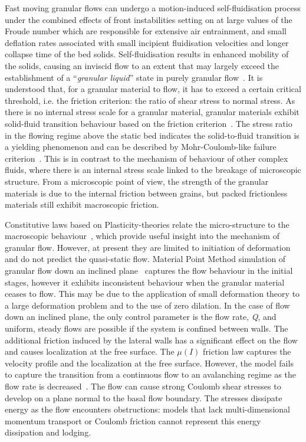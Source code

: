 Fast moving granular flows can undergo a motion-induced self-fluidisation 
process under the combined effects of front instabilities setting on at large 
values of the Froude number which are responsible for extensive air 
entrainment, and small deflation rates associated with small incipient 
fluidisation velocities and longer collapse time of the bed solids. 
Self-fluidisation results in enhanced mobility of the solids, causing an 
inviscid flow to an extent that may largely exceed the establishment of a 
``\textit{granular liquid}'' state in purely granular 
flow~\citep{Bareschino2008}. It is understood that, for a granular material to 
flow, it has to exceed a certain critical threshold, i.e. the friction 
criterion: the ratio of shear stress to normal stress. As there is no internal 
stress scale for a granular material, granular materials exhibit solid-fluid 
transition behaviour based on the friction criterion~\citep{Forterre2008}. The 
stress ratio in the flowing regime above the static bed indicates the 
solid-to-fluid transition is a yielding phenomenon and can be described by 
Mohr-Coulomb-like failure criterion~\citep{Zhang1992}. This is in contrast to 
the mechanism of behaviour of other complex fluids, where there is an internal 
stress scale linked to the breakage of microscopic structure. From a 
microscopic point of view, the strength of the granular materials is due to the 
internal friction between grains, but packed frictionless materials still 
exhibit macroscopic friction.

Constitutive laws based on Plasticity-theories relate the micro-structure to 
the macroscopic behaviour~\citep{Roux2002}, which provide useful insight into 
the mechanism of granular flow. However, at present they are limited to 
initiation of deformation and do not predict the quasi-static flow. Material 
Point Method simulation of granular flow down an inclined 
plane~\citep{Abe2006,Bandara2013} captures the flow behaviour in the initial 
stages, however it exhibits inconsistent behaviour when the granular material 
ceases to flow. This may be due to the application of small deformation theory 
to a large deformation problem and to the use of zero dilation. In the case of 
flow down an inclined plane, the only control parameter is the flow rate, 
\textit{Q}, and uniform, steady flows are possible if the system is confined 
between walls. The additional friction induced by the lateral walls has a 
significant effect on the flow and causes localization at the free surface. The 
$\mu(\textit{I})$ friction law captures the velocity profile and the 
localization at the free surface. However, the model fails to capture the 
transition from a continuous flow to an avalanching regime as the flow rate is 
decreased~\citep{Pouliquen2006}. The flow can cause strong Coulomb shear 
stresses to develop on a plane normal to the basal flow boundary. The stresses 
dissipate energy as the flow encounters obstructions: models that lack 
multi-dimensional momentum transport or Coulomb friction cannot represent this 
energy dissipation and lodging. 

